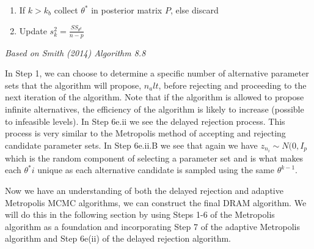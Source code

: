 \begin{tcolorbox}
\begin{enumerate}
\begin{enumerate}
\begin{enumerate}
        \end{enumerate}
        \item If $k > k_b$ collect $\theta^*$ in posterior matrix $P$, else discard
        \item Update $s_k^2 = \frac{SS_{\theta^k}}{n-p}$
    \end{enumerate}
\end{enumerate}
\emph{Based on Smith (2014) Algorithm 8.8}
\end{tcolorbox}
In Step 1, we can choose to determine a specific number of alternative parameter sets that the algorithm will propose, $n_alt$, before rejecting and proceeding to the next iteration of the algorithm. Note that if the algorithm is allowed to propose infinite alternatives, the efficiency of the algorithm is likely to increase (possible to infeasible levels). In Step 6e.ii we see the delayed rejection process. This process is very similar to the Metropolis method of accepting and rejecting candidate parameter sets. In Step 6e.ii.B we see that again we have $z_{n_i} \sim N(0, I_p$ which is the random component of selecting a parameter set and is what makes each $\theta^*i$ unique as each alternative candidate is sampled using the same $\theta^{k-1}$.
\par Now we have an understanding of both the delayed rejection and adaptive Metropolis MCMC algorithms, we can construct the final DRAM algorithm. We will do this in the following section by using Steps 1-6 of the Metropolis algorithm as a foundation and incorporating Step 7 of the adaptive Metropolis algorithm and Step 6e(ii) of the delayed rejection algorithm.
